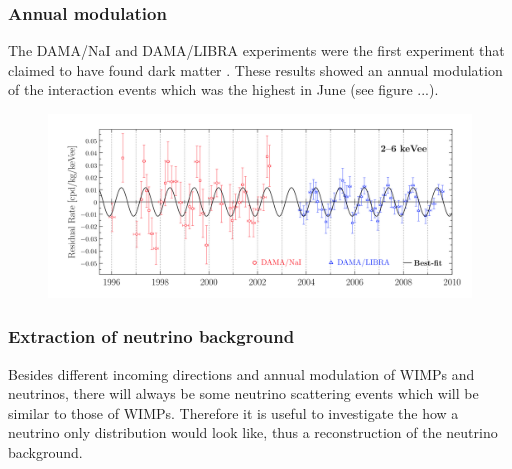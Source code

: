 \documentclass{article}
\begin{document}
\subsubsection{Annual modulation}
The DAMA/NaI and DAMA/LIBRA experiments were the first experiment that claimed to have found dark matter \cite{Freese:2012xd}. These results showed an annual modulation of the interaction events which was the highest in June (see figure ...).
\begin{figure}[h]
    \centering
    \includegraphics[width=\textwidth]{Annualmodulation.png}
    \caption{}
\end{figure}

\FloatBarrier
\subsubsection{Extraction of neutrino background}
Besides different incoming directions and annual modulation of WIMPs and neutrinos, there will always be some neutrino scattering events which will be similar to those of WIMPs. Therefore it is useful to investigate the how a neutrino only distribution would look like, thus a reconstruction of the neutrino background. 
\end{document}
